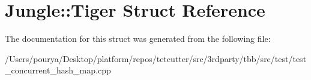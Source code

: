 \hypertarget{structJungle_1_1Tiger}{}\section{Jungle\+:\+:Tiger Struct Reference}
\label{structJungle_1_1Tiger}


The documentation for this struct was generated from the following file\+:\begin{DoxyCompactItemize}
\item 
/\+Users/pourya/\+Desktop/platform/repos/tetcutter/src/3rdparty/tbb/src/test/test\+\_\+concurrent\+\_\+hash\+\_\+map.\+cpp\end{DoxyCompactItemize}
